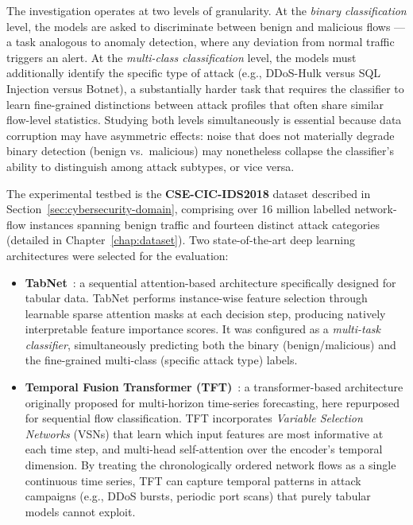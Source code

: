 The investigation operates at two levels of granularity.  At the
\emph{binary classification} level, the models are asked to discriminate
between benign and malicious flows — a task analogous to anomaly detection,
where any deviation from normal traffic triggers an alert.  At the
\emph{multi-class classification} level, the models must additionally identify
the specific type of attack (e.g., DDoS-Hulk versus SQL Injection versus
Botnet), a substantially harder task that requires the classifier to learn
fine-grained distinctions between attack profiles that often share similar
flow-level statistics.  Studying both levels simultaneously is essential
because data corruption may have asymmetric effects: noise that does not
materially degrade binary detection (benign vs.\ malicious) may nonetheless
collapse the classifier's ability to distinguish among attack subtypes, or
vice versa.

The experimental testbed is the \textbf{CSE-CIC-IDS2018} dataset described in
Section~\ref{sec:cybersecurity-domain}, comprising over 16 million labelled
network-flow instances spanning benign traffic and fourteen distinct attack
categories (detailed in Chapter~\ref{chap:dataset}).  Two state-of-the-art
deep learning architectures were selected for the evaluation:

\begin{itemize}
    \item \textbf{TabNet}~\cite{arik2021tabnet}: a sequential attention-based
          architecture specifically designed for tabular data.  TabNet performs
          instance-wise feature selection through learnable sparse attention
          masks at each decision step, producing natively interpretable feature
          importance scores.  It was configured as a \emph{multi-task
          classifier}, simultaneously predicting both the binary
          (benign/malicious) and the fine-grained multi-class (specific attack
          type) labels.
    \item \textbf{Temporal Fusion Transformer (TFT)}~\cite{lim2021temporal}: a
          transformer-based architecture originally proposed for multi-horizon
          time-series forecasting, here repurposed for sequential flow
          classification.  TFT incorporates \emph{Variable Selection Networks}
          (VSNs) that learn which input features are most informative at each
          time step, and multi-head self-attention over the encoder's temporal
          dimension.  By treating the chronologically ordered network flows as
          a single continuous time series, TFT can capture temporal patterns
          in attack campaigns (e.g., DDoS bursts, periodic port scans) that
          purely tabular models cannot exploit.
\end{itemize}

